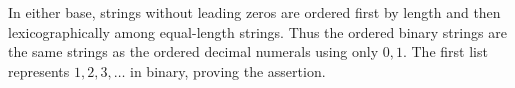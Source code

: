 In either base, strings without leading zeros are ordered first by length and then lexicographically among equal-length strings. Thus the ordered binary strings are the same strings as the ordered decimal numerals using only $0,1$. The first list represents $1,2,3,\ldots$ in binary, proving the assertion.
